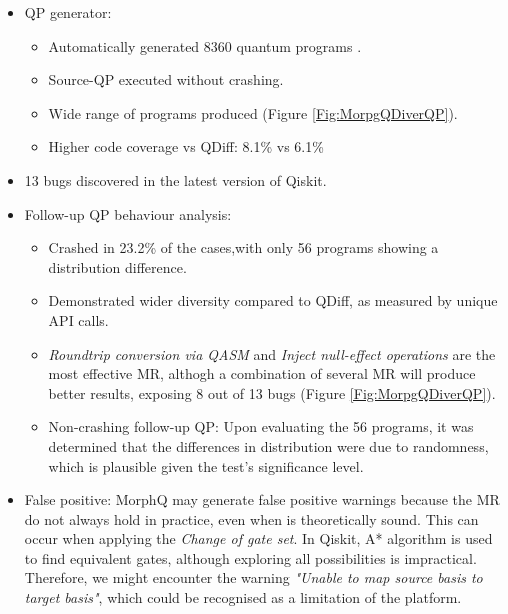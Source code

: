 \begin{itemize}
\begin{itemize}
    \item QP generator:
    \begin{itemize}
        \item Automatically generated 8360 quantum programs .
        \item Source-QP executed without crashing.
        \item Wide range of programs produced (Figure \ref{Fig:MorpgQDiverQP}). 
        \item Higher code coverage vs QDiff: 8.1\% vs 6.1\% 
    \end{itemize}
    \item 13 bugs discovered in the latest version of Qiskit.
    \item Follow-up QP behaviour analysis:
    \begin{itemize}
        \item Crashed in 23.2\% of the cases,with only 56 programs showing a distribution difference.
        \item Demonstrated wider diversity compared to QDiff, as measured by unique API calls.
        \item \textit{Roundtrip conversion via QASM} and \textit{Inject null-effect operations} are the most effective MR, althogh a combination of several MR will produce better results, exposing 8 out of 13 bugs (Figure \ref{Fig:MorpgQDiverQP}). 
        \item Non-crashing follow-up QP: Upon evaluating the 56 programs, it was determined that the differences in distribution were due to randomness, which is plausible given the test's significance level.
    \end{itemize}
    \item False positive: MorphQ may generate false positive warnings because the MR do not always hold in practice, even when is theoretically sound. This can occur when applying the \textit{Change of gate set}. In Qiskit, A* algorithm is used to find equivalent gates, although exploring all possibilities is impractical. Therefore, we might encounter the warning \textit{"Unable to map source basis to target basis"}, which  could be recognised as a limitation of the platform.
\end{itemize}


\end{itemize}
